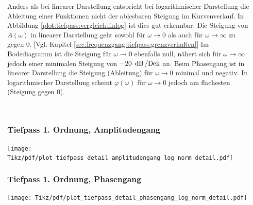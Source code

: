 \begin{frame}
{    %
    Anders als bei linearer Darstellung entspricht bei logarithmischer Darstellung 
    die Ableitung einer Funktionen nicht der ablesbaren Steigung im Kurvenverlauf.
    In Abbildung \ref{plot:tiefpass:vergleich:linlog} ist dies gut erkennbar. 
    Die Steigung von $A(\omega)$ in linearer Darstellung geht sowohl
    für $\omega \to 0$ als auch für $\omega \to \infty$ zu gegen $0$. [Vgl. Kapitel \ref{sec:frequenzgang:tiefpass:grenzverhalten}]
    Im Bodediagramm ist die Steigung für $\omega \to 0$ ebenfalls null, nähert sich für $\omega \to \infty$ 
    jedoch einer minimalen Steigung von $-20\ \dB/\mathrm{Dek}$ an. 
    Beim Phasengang ist in linearer Darstellung die Steigung (Ableitung) für $\omega \to 0$ minimal und negativ.
    In logarithmischer Darstellung scheint $\varphi(\omega)$ für $\omega \to 0$ jedoch am flachesten (Steigung gegen $0$).
}
\end{frame}

\b{%
\subsubsection{Tiefpass 1. Ordnung, Amplitudengang}
\begin{frame}\ftx{\subsubsecname}\centering
    \texttt{[image: Tikz/pdf/plot\_tiefpass\_detail\_amplitudengang\_log\_norm\_detail.pdf]}
\end{frame}
\subsubsection{Tiefpass 1. Ordnung, Phasengang}
\begin{frame}\ftx{\subsubsecname}\centering
    \texttt{[image: Tikz/pdf/plot\_tiefpass\_detail\_phasengang\_log\_norm\_detail.pdf]}
\end{frame}
}

